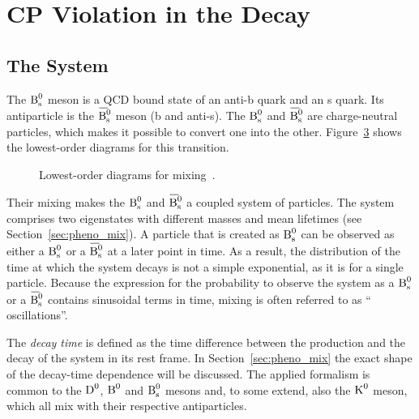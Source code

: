 \section{CP Violation in the \texorpdfstring{\BstoJpsiphi{}}{Bs0->Jpsiphi} Decay}
\label{sec:intro_Jpsiphi}

\subsection{The \texorpdfstring{\BsBsbar{}}{Bs0-Bs0bar} System}
\label{subsec:intro_Jpsiphi_Bs}

The $\text{B}_\text{s}^\text{0}$ meson is a QCD bound state of an anti-b quark and an s quark. Its antiparticle is the $\Bsbar$ meson (b and anti-s). The $\text{B}_\text{s}^\text{0}$
and $\Bsbar$ are charge-neutral particles, which makes it possible to convert one into the other. Figure~\ref{fig:mixing} shows the
lowest-order diagrams for this transition.
\begin{figure}[hbt]
  \centering
  \begin{subfigure}{0.5\textwidth}
    \centering
    {\sffamily }
    \label{fig:mixing_1}
  \end{subfigure}%
  \begin{subfigure}{0.5\textwidth}
    \centering
    {\sffamily }
    \label{fig:mixing_2}
  \end{subfigure}
  \caption{Lowest-order diagrams for \BsBsbar{} mixing~\cite{LHCb-PAPER-2013-002}.}
  \label{fig:mixing}
\end{figure}

Their mixing makes the $\text{B}_\text{s}^\text{0}$ and $\Bsbar$ a coupled system of particles. The system comprises two eigenstates with different masses and
mean lifetimes (see Section~\ref{sec:pheno_mix}). A particle that is created as $\text{B}_\text{s}^\text{0}$ can be observed as either a $\text{B}_\text{s}^\text{0}$ or a $\Bsbar$ at a
later point in time. As a result, the distribution of the time at which the \BsBsbar{} system decays is not a simple exponential, as it is
for a single particle. Because the expression for the probability to observe the system as a $\text{B}_\text{s}^\text{0}$ or a $\Bsbar$ contains sinusoidal
terms in time, mixing is often referred to as ``\BsBsbar{} oscillations''.

The \emph{decay time} is defined as the time difference between the production and the decay of the \BsBsbar{} system in its rest frame. In
Section~\ref{sec:pheno_mix} the exact shape of the decay-time dependence will be discussed. The applied formalism is common to the $\text{D}^\text{0}$,
$\text{B}^\text{0}$ and $\text{B}_\text{s}^\text{0}$ mesons and, to some extend, also the $\text{K}^\text{0}$ meson, which all mix with their respective antiparticles.

